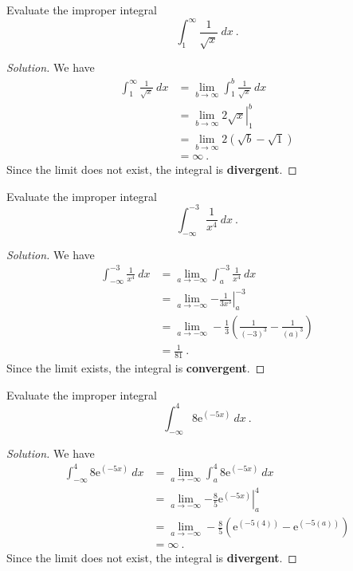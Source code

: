 \documentclass[compacto,10pt,comentarios]{aleph-notas}
\begin{document}
\begin{ejer}
    Evaluate the improper integral
    $$
        \int_{1}^{\infty} \frac{1}{\sqrt{x}} ~ dx ~ .
    $$
\end{ejer}
\begin{proof}[Solution]
    We have
    \begin{align*}
        \int_{1}^{\infty} \frac{1}{\sqrt{x}} ~ dx
            & = \lim_{b \to \infty} \int_{1}^{b} \frac{1}{\sqrt{x}} ~ dx \\
            & = \lim_{b \to \infty} \left. 2\sqrt{x} \right\rvert_{1}^{b} \\
            & = \lim_{b \to \infty} 2 \left( \sqrt{b} - \sqrt{1} \right) \\
            & = \infty ~ .
    \end{align*}
    Since the limit does not exist, the integral is \textbf{divergent}.
\end{proof}

\begin{ejer}
    Evaluate the improper integral
    $$
        \int_{-\infty}^{-3} \frac{1}{x^{4}} ~ dx ~ .
    $$
\end{ejer}
\begin{proof}[Solution]
    We have
    \begin{align*}
        \int_{-\infty}^{-3} \frac{1}{x^{4}} ~ dx
            & = \lim_{a \to -\infty} \int_{a}^{-3} \frac{1}{x^{4}} ~ dx \\
            & = \lim_{a \to -\infty} \left. -\frac{1}{3x^{3}} \right\rvert_{a}^{-3} \\
            & = \lim_{a \to -\infty} -\frac{1}{3} \left( \frac{1}{(-3)^{3}} - \frac{1}{(a)^{3}} \right) \\
            & = \frac{1}{81} ~ .
    \end{align*}
    Since the limit exists, the integral is \textbf{convergent}.
\end{proof}

\begin{ejer}
    Evaluate the improper integral
    $$
        \int_{-\infty}^{4} 8\mathrm{e}^{(-5x)} ~ dx ~ .
    $$
\end{ejer}
\begin{proof}[Solution]
    We have
    \begin{align*}
        \int_{-\infty}^{4} 8\mathrm{e}^{(-5x)} ~ dx
            & = \lim_{a \to -\infty} \int_{a}^{4} 8\mathrm{e}^{(-5x)} ~ dx \\
            & = \lim_{a \to -\infty} \left. -\frac{8}{5}  \mathrm{e}^{(-5x)} \right\rvert_{a}^{4} \\
            & = \lim_{a \to -\infty} -\frac{8}{5} \left( \mathrm{e}^{(-5(4))} - \mathrm{e}^{(-5(a))} \right) \\
            & = \infty ~ .
    \end{align*}
    Since the limit does not exist, the integral is \textbf{divergent}.
\end{proof}
\end{document}
